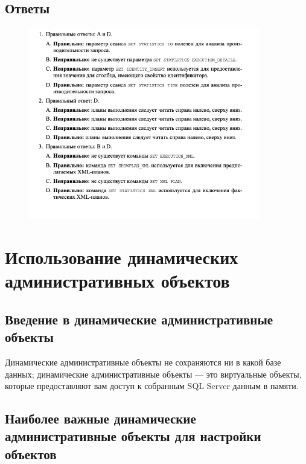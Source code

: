 \subsection*{Ответы}

\begin{figure}[h!]
	\begin{center}
		\includegraphics[width=0.9\textwidth]{img/ans41.png}
	\end{center}
	\captionsetup{justification=centering}
\end{figure}



\section{Использование динамических административных объектов}


\subsection{Введение в динамические административные объекты}

Динамические административные объекты не сохраняются ни в какой базе данных;
динамические административные объекты — это виртуальные объекты, которые
предоставляют вам доступ к собранным SQL Server данным в памяти. 

\subsection{Наиболее важные динамические административные объекты для настройки объектов}

